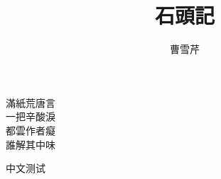 \documentclass[12pt]{article}
\title{石頭記}
\author{曹雪芹}
\date{}
\begin{document}
\maketitle

\begin{center}
滿紙荒唐言\\
一把辛酸淚\\
都雲作者癡\\
誰解其中味\\
\end{center}
中文测试
\end{document}
